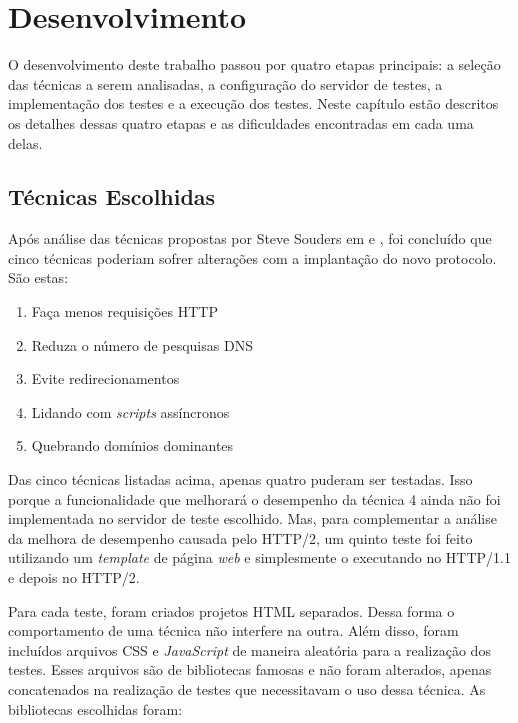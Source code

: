 %
%

\chapter{Desenvolvimento}

O desenvolvimento deste trabalho passou por quatro etapas principais: a seleção das técnicas a serem analisadas, a configuração do servidor de testes, a implementação dos testes e a execução dos testes. Neste capítulo estão descritos os detalhes dessas quatro etapas e as dificuldades encontradas em cada uma delas.

\section{Técnicas Escolhidas}
\label{tecnicasescolhidas}

Após análise das técnicas propostas por Steve Souders em \cite{HighPerformance} e \cite{EvenFaster}, foi concluído que cinco técnicas poderiam sofrer alterações com a implantação do novo protocolo. São estas:

\begin{enumerate}
	\item Faça menos requisições HTTP
	\item Reduza o número de pesquisas DNS
	\item Evite redirecionamentos
	\item Lidando com \textit{scripts} assíncronos
	\item Quebrando domínios dominantes
\end{enumerate}

Das cinco técnicas listadas acima, apenas quatro puderam ser testadas. Isso porque a funcionalidade que melhorará o desempenho da técnica 4 ainda não foi implementada no servidor de teste escolhido. Mas, para complementar a análise da melhora de desempenho causada pelo HTTP/2, um quinto teste foi feito utilizando um \textit{template} de página \textit{web} e simplesmente o executando no HTTP/1.1 e depois no HTTP/2.

Para cada teste, foram criados projetos HTML separados. Dessa forma o comportamento de uma técnica não interfere na outra. Além disso, foram incluídos arquivos CSS e \textit{JavaScript} de maneira aleatória para a realização dos testes. Esses arquivos são de bibliotecas famosas e não foram alterados, apenas concatenados na realização de testes que necessitavam o uso dessa técnica. As bibliotecas escolhidas foram:

